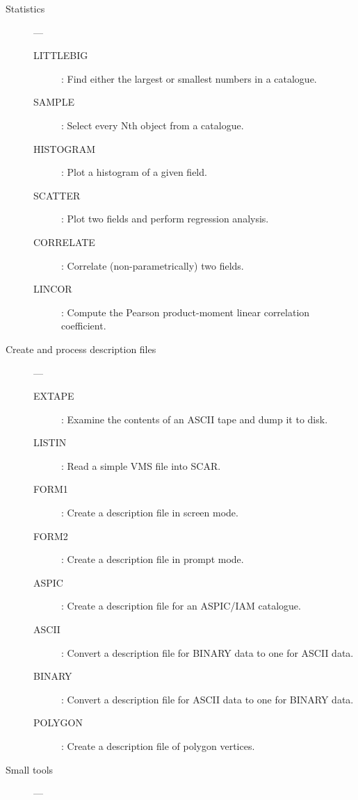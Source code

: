 \begin{description}
\item [Statistics] ---

\begin{description}
\item [LITTLEBIG] : Find either the largest or smallest numbers in a catalogue.
\item [SAMPLE] : Select every Nth object from a catalogue.
\item [HISTOGRAM] : Plot a histogram of a given field.
\item [SCATTER] : Plot two fields and perform regression analysis.
\item [CORRELATE] : Correlate (non-parametrically) two fields.
\item [LINCOR] : Compute the Pearson product-moment linear correlation
  coefficient.
\end{description}

\item [Create and process description files] ---

\begin{description}
\item [EXTAPE] : Examine the contents of an ASCII tape and dump it to disk.
\item [LISTIN] : Read a simple VMS file into SCAR.
\item [FORM1] : Create a description file in screen mode.
\item [FORM2] : Create a description file in prompt mode.
\item [ASPIC] : Create a description file for an ASPIC/IAM catalogue.
\item [ASCII] : Convert a description file for BINARY data to one for ASCII
 data.
\item [BINARY] : Convert a description file for ASCII data to one for BINARY
 data.
\item [POLYGON] : Create a description file of polygon vertices.
\end{description}

\item [Small tools] ---


\end{description}
